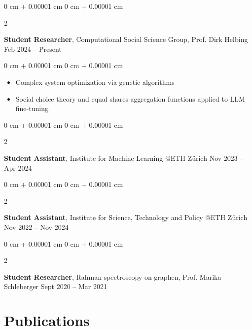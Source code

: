 \documentclass[10pt, letterpaper]{article}
\newenvironment{highlights}{
    \begin{itemize}[
        topsep=0.10 cm,
        parsep=0.10 cm,
        partopsep=0pt,
        itemsep=0pt,
        leftmargin=0 cm + 10pt
    ]
}{
    \end{itemize}
} %
\newenvironment{onecolentry}{
    \begin{adjustwidth}{
        0 cm + 0.00001 cm
    }{
        0 cm + 0.00001 cm
    }
}{
    \end{adjustwidth}
} %
\newenvironment{twocolentry}[2][]{
    \onecolentry
    \def\secondColumn{#2}
    \setcolumnwidth{\fill, 4.5 cm}
    \begin{paracol}{2}
}{
    \switchcolumn \raggedleft \secondColumn
    \end{paracol}
    \endonecolentry
} %
\begin{document}
        \vspace{0.2 cm}



        
        \begin{twocolentry}{
            Feb 2024 – Present
        }
            \textbf{Student Researcher}, Computational Social Science Group, Prof. Dirk Helbing\end{twocolentry}

        \vspace{0.10 cm}
        \begin{onecolentry}
            \begin{highlights}
                \item Complex system optimization via genetic algorithms
                \item Social choice theory and equal shares aggregation functions applied to LLM fine-tuning 

            \end{highlights}
        \end{onecolentry}

        \vspace{0.2 cm}

        \begin{twocolentry}{
            Nov 2023 – Apr 2024
        }
            \textbf{Student Assistant}, Institute for Machine Learning @ETH Zürich\end{twocolentry}

        \vspace{0.2 cm}

        \begin{twocolentry}{
            Nov 2022 – Nov 2024
        }
            \textbf{Student Assistant}, Institute for Science, Technology and Policy @ETH Zürich\end{twocolentry}


        

        \vspace{0.2 cm}

        \begin{twocolentry}{
            Sept 2020 – Mar 2021
        }
            \textbf{Student Researcher}, Rahman-spectroscopy on graphen, Prof. Marika Schleberger \end{twocolentry}

   
        \vspace{0.2 cm}

      

\section{Publications}
\end{document}
